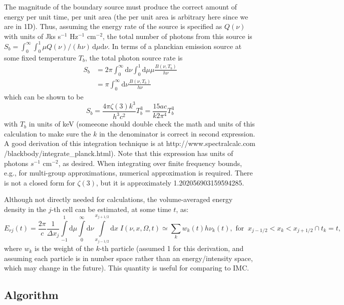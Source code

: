 \documentclass{article}
\renewcommand{\d}{\mathrm{d}}
\newcommand{\xl}{{x_{j-1/2}}}
\newcommand{\xr}{{x_{j+1/2}}}
\begin{document}
  The magnitude of the boundary source must produce the correct amount of energy per
unit time, per unit area (the per unit area is arbitrary here since we are in 1D).
Thus, assuming the energy rate of the source is specified as $Q(\nu)$ with units
of Jks s$^{-1}$ Hz$^{-1}$ cm$^{-2}$, the total number of photons from this source is
$S_b = \int_{0}^{\infty}\int_0^1 \mu Q(\nu)/(h\nu) \,\d\mu \d \nu$. In terms of a planckian emission source at some fixed
temperature $T_b$, the total photon source rate is
\begin{align} 
 S_b & = 2\pi \int_0^\infty \d \nu \int_0^1 \d \mu \mu \frac{B(\nu,T_b)}{h\nu} \\
     & = \pi \int_0^\infty \d \nu \frac{B(\nu,T_b)}{h\nu} 
\end{align}
which can be shown to be
\begin{equation}
 S_b = \frac{4 \pi \zeta(3) k^3}{h^3 c^2} T_b^3 = \frac{15 a c}{k 2\pi^4} T_b^3
\end{equation}
with $T_b$ in units of keV (someeone should double check the math and units of this
calculation to make sure the $k$ in the denominator is correct in second expression. A good derivation of this integration
technique is at http://www.spectralcalc.com /blackbody/integrate\_planck.html).  Note
that this expression has units of photons $s^{-1} \text{ cm}^{-2}$, as desired.
When integrating over
finite frequency bounds, e.g., for multi-group approximations, numerical approximation is
required.  There is not a closed form for
$\zeta(3)$, but it is approximately 1.202056903159594285.

 Although not directly needed for calculations, the volume-averaged energy
density in the $j$-th cell can be estimated, at some time $t$, as:
\begin{equation}
 E_{rj}(t) = \frac{2\pi}{c} \frac{1}{\Delta x_j} \int\limits_{-1}^1 \d \mu \int\limits_0^\infty \d \nu \int\limits_\xl^\xr \d x \; I(\nu,x,\Omega,t)  
		\simeq \sum_k w_k(t) h \nu_k(t), \text{ for} \;\;\xl < x_k < \xr \cap t_k=t,
\end{equation}
where $w_k$ is the weight of the $k$-th particle (assumed 1 for this derivation, and 
assuming each particle is in number space rather than an energy/intensity space, which may change in the future).
This quantity is useful for comparing to IMC.

\subsection{Algorithm}
\end{document}

